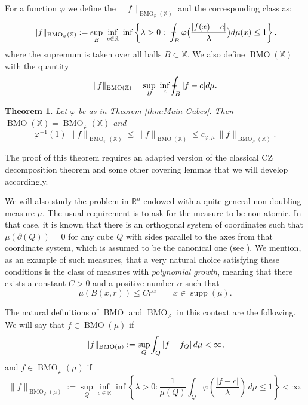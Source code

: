 \documentclass[11pt,a4paper]{amsart}
\newtheorem{theorem}{Theorem}[section]
\theoremstyle{definition}
\theoremstyle{remark}
\numberwithin{equation}{section}
\DeclareMathOperator{\BMO}{BMO}
\DeclareMathOperator*{\supp}{supp}
\def\R{{\mathbb R}}
\def\Xint#1{\mathchoice
  {\XXint\displaystyle\textstyle{#1}}%
  {\XXint\textstyle\scriptstyle{#1}}%
  {\XXint\scriptstyle\scriptscriptstyle{#1}}%
  {\XXint\scriptscriptstyle\scriptscriptstyle{#1}}%
  \!\int}
\def\XXint#1#2#3{{\setbox0=\hbox{$#1{#2#3}{\int}$}
    \vcenter{\hbox{$#2#3$}}\kern-.5\wd0}}
\def\avgint{\Xint-}
\numberwithin{equation}{section}
\begin{document}
For a function $\varphi$ we define the $\|f\|_{\BMO_\varphi(\mathbb X)}$ and the  corresponding class as:
\begin{equation*}%
\|f\|_{\BMO_\varphi(\mathbb X)} := \sup_B \ \inf_{c\in \R} \ \inf \left \{\lambda>0 : \ \avgint_B \varphi\big( \frac{|f(x)-c|}{\lambda}\big) d\mu(x) \leq 1 \right \},
\end{equation*}
where the supremum is taken over all balls $B\subset \mathbb X$. We also define $\BMO(\mathbb X)$ with the quantity
%
\[
\|f\|_{\BMO(\mathbb X)} = \sup_B \ \inf_c \avgint_B |f-c|d\mu. 
\]
% 

\begin{theorem}\label{thm:homogen}
Let $\varphi$ be as in Theorem \ref{thm:Main-Cubes}. Then $\BMO(\mathbb X)= \BMO_\varphi(\mathbb X)$ and 
%
\begin{equation*}
\varphi^{-1}(1) \: \|f\|_{\BMO_\varphi(\mathbb X)} \leq \|f\|_{\BMO(\mathbb X)} \leq c_{\varphi, \mu} \: \|f\|_{\BMO_\varphi(\mathbb X)}.
\end{equation*}
%
\end{theorem}




The proof of this theorem requires an adapted version of the classical CZ decomposition theorem and some other covering lemmas that we will develop accordingly.

We will also study the problem in $\R^n$ endowed with a quite general non doubling measure $\mu$. The usual requirement is to ask for the measure to be non atomic. In that case, it is known that there is an orthogonal system of coordinates such that $\mu(\partial(Q))=0$ for any cube $Q$ with sides parallel to the axes from that coordinate system, which is assumed to be the canonical one (see \cite{MMNO}). We mention, as an example of such measures, that a very natural choice satisfying these conditions is the class of measures with \emph{polynomial growth}, meaning that there exists a constant $C>0$ and a positive number $\alpha$ such that 
\begin{equation}\label{eq:Measure-Growht}
\mu(B(x,r))\le C r^\alpha \qquad x\in \supp(\mu).
\end{equation}


The natural definitions of $\BMO$ and $\BMO_\varphi$ in this context are the following. We will say that $f\in \BMO(\mu)$ if 
\begin{equation*}%
\|f\|_{\BMO(\mu)}:=\sup_{Q}\avgint_Q |f-f_Q|\,d\mu<\infty,
\end{equation*}
%
and $f\in \BMO_\varphi(\mu)$ if 
%
\begin{equation*}%
\|f\|_{\BMO_\varphi(\mu)}:=\sup_{Q}
\inf_{c\in \R}\inf\left\{  \lambda > 0 : \frac{1}{\mu(Q)}
\int_Q \varphi\left(\frac{|f-c|}{\lambda}\right)\,d\mu \leq 1 \right\}<\infty.
\end{equation*}
\end{document}
